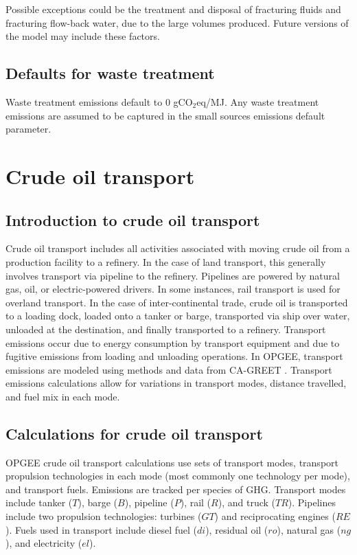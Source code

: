 \documentclass[11pt]{report}
\begin{document}
Possible exceptions could be the treatment and disposal of fracturing fluids and fracturing flow-back water, due to the large volumes produced. Future versions of the model may include these factors.

\subsection{Defaults for waste treatment}

Waste treatment emissions default to 0 gCO$_2$eq/MJ. Any waste treatment emissions are assumed to be captured in the small sources emissions default parameter. 



\clearpage

\section{Crude oil transport}
 \label{sec:transport}

\subsection{Introduction to crude oil transport}

Crude oil transport includes all activities associated with moving crude oil from a production facility to a refinery. In the case of land transport, this generally involves transport via pipeline to the refinery. Pipelines are powered by natural gas, oil, or electric-powered drivers. In some instances, rail transport is used for overland transport. In the case of inter-continental trade, crude oil is transported to a loading dock, loaded onto a tanker or barge, transported via ship over water, unloaded at the destination, and finally transported to a refinery.
Transport emissions occur due to energy consumption by transport equipment and due to fugitive emissions from loading and unloading operations. In OPGEE, transport emissions are modeled using methods and data from CA-GREET \cite{Wang2009}. Transport emissions calculations allow for variations in transport modes, distance travelled, and fuel mix in each mode. 


\subsection{Calculations for crude oil transport}

OPGEE crude oil transport calculations use sets of transport modes, transport propulsion technologies in each mode (most commonly one technology per mode), and transport fuels. Emissions are tracked per species of GHG. Transport modes include tanker ($T$), barge ($B$), pipeline ($P$), rail ($R$), and truck ($TR$). Pipelines include two propulsion technologies: turbines ($GT$) and reciprocating engines ($RE$). Fuels used in transport include diesel fuel ($di$), residual oil ($ro$), natural gas ($ng$), and electricity ($el$). 
\end{document}
